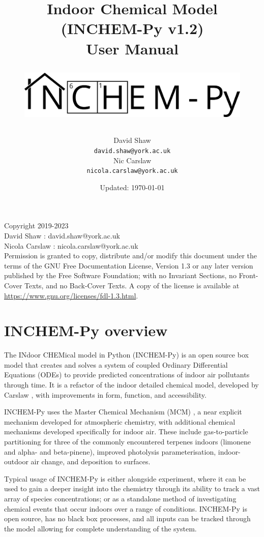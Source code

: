 \documentclass[a4paper]{refart}
\title{Indoor Chemical Model (INCHEM-Py v1.2) \\
User Manual\\
\begin{figure}
    \hspace{-0.25\textwidth}\hspace{0.25in}
    \includegraphics[width=\textwidth]{INCHEMPY_logo.png}
\end{figure}}
\author{
David Shaw\\
\texttt{david.shaw@york.ac.uk}\\
Nic Carslaw\\
\texttt{nicola.carslaw@york.ac.uk}\\
}
\date{Updated: \today}
\begin{document}
\maketitle


\newpage
\tableofcontents


\vspace*{\fill}

Copyright \textcopyright \hspace{1mm}2019-2023 \\
David Shaw : david.shaw@york.ac.uk\\
Nicola Carslaw : nicola.carslaw@york.ac.uk\\


Permission is granted to copy, distribute and/or modify this
document under the terms of the GNU Free Documentation License,
Version 1.3 or any later version published by the Free Software
Foundation; with no Invariant Sections, no Front-Cover Texts, and
no Back-Cover Texts.  A copy of the license is available at \url{https://www.gnu.org/licenses/fdl-1.3.html}.


\newpage
\section{INCHEM-Py overview}
The INdoor CHEMical model in Python (INCHEM-Py) is an open source box model that creates and solves a system of coupled Ordinary Differential Equations (ODEs) to provide predicted concentrations of indoor air pollutants through time. It is a refactor of the indoor detailed chemical model, developed by Carslaw  \cite{Carslaw2007}, with improvements in form, function, and accessibility.

INCHEM-Py uses the Master Chemical Mechanism (MCM) \cite{Jenkin1997,Saunders2003,Bloss2005,Jenkin2012,Jenkin2015}, a near explicit mechanism developed for atmospheric chemistry, with additional chemical mechanisms developed specifically for indoor air. These include gas-to-particle partitioning for three of the commonly encountered terpenes indoors (limonene and alpha- and beta-pinene), improved photolysis parameterisation, indoor-outdoor air change, and deposition to surfaces. 

Typical usage of INCHEM-Py is either alongside experiment, where it can be used to gain a deeper insight into the chemistry through its ability to track a vast array of species concentrations; or as a standalone method of investigating chemical events that occur indoors over a range of conditions. INCHEM-Py is open source, has no black box processes, and all inputs can be tracked through the model allowing for complete understanding of the system.  
\end{document}
